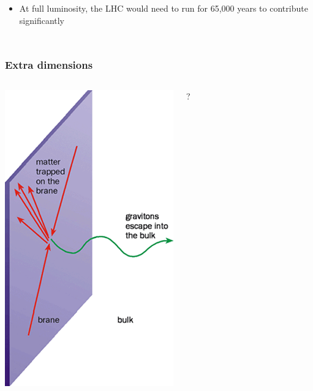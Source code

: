 \documentclass[compress]{beamer}
\begin{document}
\begin{frame}
\begin{columns}
\begin{itemize}
\item At full luminosity, the LHC would need to run for 65,000 years
  to contribute significantly
\end{itemize}
\end{columns}
\end{frame}

\begin{frame}
\frametitle{Extra dimensions}
\begin{columns}
\includegraphics[width=\linewidth]{extra_dimensions2.png}
\begin{center}
?
\end{center}
\end{columns}
\end{frame}
\end{document}

